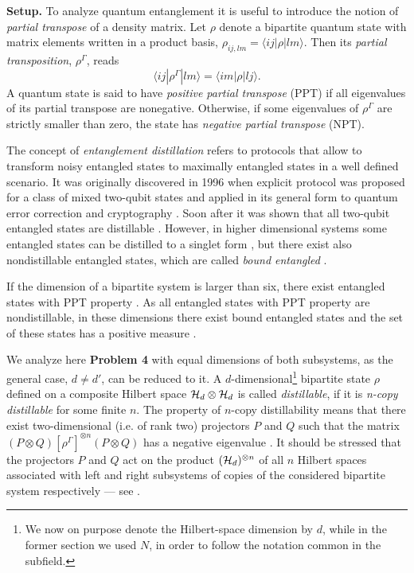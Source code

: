 \documentclass[english,aps,pra,nofootinbib,twocolumn,superscriptaddress]{revtex4-1}
\newcommand{\1}{{\rm 1\hspace{-0.9mm}l}}
\begin{document}
{\bf   Setup.} 
To analyze quantum entanglement it is useful to introduce
the notion of {\sl partial transpose} of a density matrix.
Let $\rho$ denote a bipartite quantum state with matrix elements
written in a product basis, $\rho_{ij,lm}= \langle i j| \rho | l m  \rangle$.
Then its  {\it partial transposition},  $\rho^{\Gamma}$, reads
\begin{equation}\label{NPT}
\langle i j | \rho^{\Gamma} |  l m \rangle = \langle i m| \rho | l j  \rangle. 
\end{equation}
A  quantum state is said to have {\it positive partial transpose} (PPT) 
if all eigenvalues of its partial transpose are nonegative.
Otherwise, if some eigenvalues of  $\rho^{\Gamma}$ are strictly smaller than zero,
the state has  {\it negative partial transpose} (NPT).

  The concept of {\it entanglement distillation} refers to
protocols that allow to transform noisy entangled states to maximally 
entangled states in a well defined scenario. It was  originally discovered in 1996 when explicit
protocol was proposed for a class of mixed two-qubit states 
\cite{Bennett-Distillation96} and applied in its general form to quantum error correction 
\cite{Bennett-ErrorCorrection96} and cryptography \cite{Deutsch-EtAl-96}.  
Soon after it was shown that all two-qubit entangled states are distillable
\cite{HHH97}. However, in higher dimensional systems
some entangled states can be distilled to a singlet form \cite{HH99}, 
but  there exist also nondistillable entangled states,
which are called {\sl bound entangled}  \cite{HHH98,Ho19}.

If the dimension of a bipartite system is larger than six,
 there exist entangled states with PPT property \cite{Ho97}.
As all entangled states with PPT property are nondistillable,
 in these dimensions there exist bound entangled states \cite{HHH98}
 and the set of these states has a positive measure \cite{Zy99}.

 We analyze here {\bf Problem 4} with 
	equal dimensions of both subsystems, as the general case, $d\ne d'$,  can be 
	reduced to it. 
 A $d$-dimensional\footnote{We now on purpose denote the Hilbert-space dimension by $d$, while in the former section we used $N$, in order to follow the notation common in the subfield.} bipartite state $\rho$ defined on a composite
  Hilbert space   ${\cal H}_{d} \otimes  {\cal H}_{d}$  
is called  {\it distillable}, if it is {\it n-copy distillable} for some finite $n$.
 The property of $n$-copy distillability means that there exist two-dimensional (i.e. of rank two) projectors $P$ and $Q$ such that 
the matrix $(P \otimes Q) [\rho^{\Gamma}]^{\otimes n} (P \otimes Q)$ has 
a negative eigenvalue \cite{HHH98,Cl06,Ho19}.
It should be stressed that the projectors $ P$  and $Q$ act
 on the product $({\cal H}_d)^{\otimes n}$ of all  $n$ Hilbert spaces  associated with 
left and right subsystems of copies of the considered bipartite system respectively
--- see  \cite{DSSTT00,Pankowski2010}.  
\end{document}
